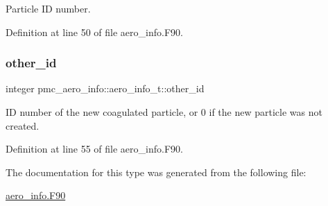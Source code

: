 Particle ID number. 



Definition at line 50 of file aero\+\_\+info.\+F90.

\mbox{\label{structpmc__aero__info_1_1aero__info__t_a8609952c4bb522fa2315726ece137680}} 
\subsubsection{\texorpdfstring{other\+\_\+id}{other\_id}}
{\footnotesize\ttfamily integer pmc\+\_\+aero\+\_\+info\+::aero\+\_\+info\+\_\+t\+::other\+\_\+id}



ID number of the new coagulated particle, or 0 if the new particle was not created. 



Definition at line 55 of file aero\+\_\+info.\+F90.



The documentation for this type was generated from the following file\+:\begin{DoxyCompactItemize}
\item 
\mbox{\hyperlink{aero__info_8_f90}{aero\+\_\+info.\+F90}}\end{DoxyCompactItemize}
